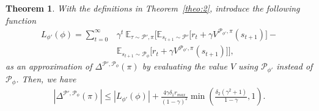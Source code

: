 \documentclass[letterpaper]{article} %
\def\E{{\mathbb{E}}}
\def\P{{\mathcal{P}}}
\newtheorem{theorem}{Theorem}%
\begin{document}
\begin{theorem}
\label{theo:3}
With the definitions in Theorem~\ref{theo:2}, introduce the following function
{\small
\begin{align}
L_{\phi'}(\phi)
=\sum_{t=0}^{\infty}&\gamma^t\ 
\E_{\tau \sim \P',\pi}
\bigg[
\E_{s_{t+1}\sim\P'}\big[
r_t+\gamma V^{\P_{\phi'},\pi}(s_{t+1})
\big]-
\nonumber \\
&\E_{s_{t+1}\sim\P_{\phi}}
\big[
r_t+\gamma V^{\P_{\phi'},\pi}(s_{t+1})
\big]
\bigg],
\end{align}
}as an approximation of $\Delta^{\P',\P_{\phi}}(\pi)$ by evaluating the value $V$ using $\P_{\phi'}$ instead of $\P_{\phi}$. Then, we have
{\small
\begin{equation}
\begin{aligned}
|\Delta^{\P',\P_{\phi}}(\pi)|
\leq
|L_{\phi'}(\phi)|+
\frac{4\gamma\delta_1r_{max}}{(1-\gamma)^2}
\min\left(\frac{\delta_2(\gamma^2+1)}{1-\gamma}, 1\right).
\end{aligned}
\end{equation}
}
\end{theorem}
\end{document}
